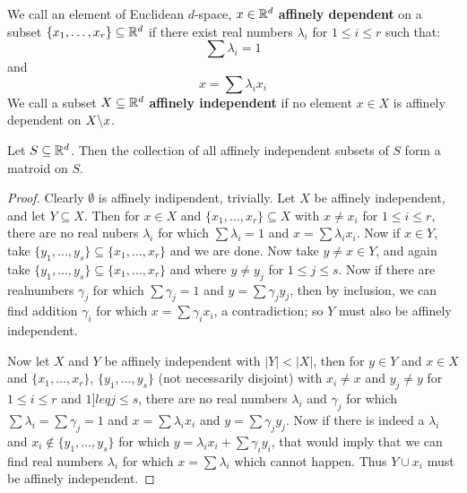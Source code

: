 \begin{definition}
    We call an element of Euclidean $d$-space, $x \in \mathbb{R}^d$ \textbf{affinely dependent} on a subset
    $\{x_1, \dots, x_r\} \subseteq \mathbb{R}^d$ if there exist real numbers $\lambda_i$ for  $1 \leq i \leq
    r$ such that:
        \begin{equation}
            \sum{\lambda_i}=1
        \end{equation}
    and
        \begin{equation}
            x=\sum{\lambda_ix_i}
        \end{equation} 
        We call a subset $X \subseteq \mathbb{R}^d$ \textbf {affinely independent} if no element $x \in X$ is
        affinely dependent on  $X\backslash x$.
\end{definition}

\begin{theorem}\label{1.2.6}
    Let $S \subseteq \mathbb{R}^d$. Then the collection of all affinely independent subsets of  $S$ form a
    matroid on $S$.
\end{theorem}
\begin{proof}
    Clearly $\emptyset$ is affinely indipendent, trivially. Let $X$ be affinely independent, and let
     $Y \subseteq X$. Then for  $x \in X$ and  $\{x_1, \dots, x_r\} \subseteq X$ with $x \neq x_i$
     for  $1 \leq i \leq r$, there are no real nubers  $\lambda_i$ for which  $\sum{\lambda_i}=1$ and
     $x=\sum{\lambda_ix_i}$. Now if $x \in Y$, take  $\{y_1, \dots, y_s\} \subseteq \{x_1, \dots,
     x_r\}$ and we are done. Now take $y \neq x \in Y$, and again take $\{y_1, \dots, y_s\} \subseteq \{x_1, \dots,
     x_r\}$ and where $y \neq y_j$ for  $1 \leq j \leq s$. Now if there are realnumbers  $\gamma_j$
     for which  $\sum{\gamma_j}=1$ and $y=\sum{\gamma_jy_j}$, then by inclusion, we can find
     addition $\gamma_i$ for which  $x=\sum{\gamma_ix_i}$, a contradiction; so $Y$ must also be
     affinely independent.
     
     Now let  $X$ and $Y$ be affinely independent with  $|Y|<|X|$, then for  $y \in Y$ and  $x \in
     X$ and  $\{x_1, \dots, x_r\}$, $\{y_1, \dots, y_s\}$ (not necessarily disjoint) with $x_i \neq
     x$ and  $y_j \neq y$ for  $1 \leq i \leq r$ and  $1 ]leq j \leq s$, there are no real numbers
     $\lambda_i$ and  $\gamma_j$ for which  $\sum{\lambda_i}=\sum{\gamma_j}=1$ and
     $x=\sum{\lambda_ix_i}$ and $y=\sum{\gamma_jy_j}$. Now if there is indeed a $\lambda_i$ and
     $x_i \notin \{y_1, \dots, y_s\}$ for which $y=\lambda_ix_i+\sum{\gamma_iy_i}$, that would imply
     that we can find real numbers $\lambda_i$ for which  $x=\sum{\lambda_i}$ which cannot happen.
     Thus $Y \cup x_i$ must be affinely independent.
\end{proof}

